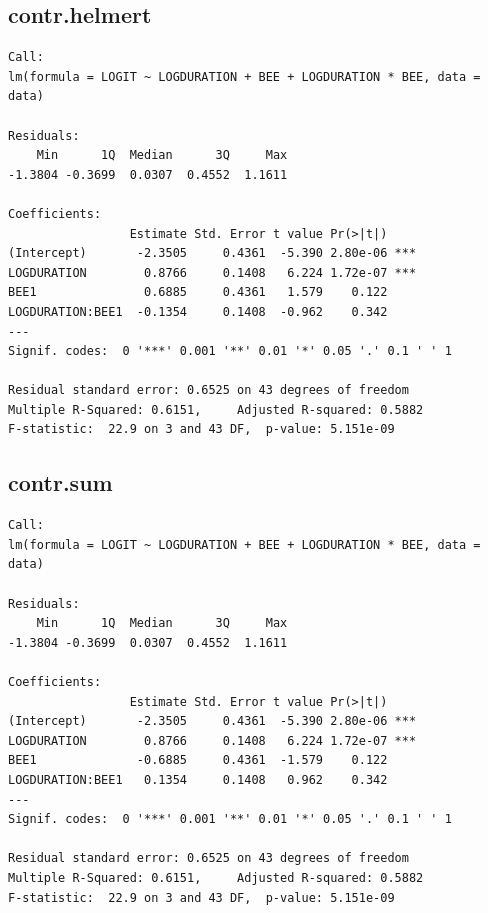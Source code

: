 \documentclass[a4paper,10pt]{article}
\begin{document}
\subsection{contr.helmert}
\begin{verbatim}
Call:
lm(formula = LOGIT ~ LOGDURATION + BEE + LOGDURATION * BEE, data = data)

Residuals:
    Min      1Q  Median      3Q     Max
-1.3804 -0.3699  0.0307  0.4552  1.1611

Coefficients:
                 Estimate Std. Error t value Pr(>|t|)
(Intercept)       -2.3505     0.4361  -5.390 2.80e-06 ***
LOGDURATION        0.8766     0.1408   6.224 1.72e-07 ***
BEE1               0.6885     0.4361   1.579    0.122
LOGDURATION:BEE1  -0.1354     0.1408  -0.962    0.342
---
Signif. codes:  0 '***' 0.001 '**' 0.01 '*' 0.05 '.' 0.1 ' ' 1

Residual standard error: 0.6525 on 43 degrees of freedom
Multiple R-Squared: 0.6151,     Adjusted R-squared: 0.5882
F-statistic:  22.9 on 3 and 43 DF,  p-value: 5.151e-09
\end{verbatim}

\subsection{contr.sum}
\begin{verbatim}
Call:
lm(formula = LOGIT ~ LOGDURATION + BEE + LOGDURATION * BEE, data = data)

Residuals:
    Min      1Q  Median      3Q     Max
-1.3804 -0.3699  0.0307  0.4552  1.1611

Coefficients:
                 Estimate Std. Error t value Pr(>|t|)
(Intercept)       -2.3505     0.4361  -5.390 2.80e-06 ***
LOGDURATION        0.8766     0.1408   6.224 1.72e-07 ***
BEE1              -0.6885     0.4361  -1.579    0.122
LOGDURATION:BEE1   0.1354     0.1408   0.962    0.342
---
Signif. codes:  0 '***' 0.001 '**' 0.01 '*' 0.05 '.' 0.1 ' ' 1

Residual standard error: 0.6525 on 43 degrees of freedom
Multiple R-Squared: 0.6151,     Adjusted R-squared: 0.5882
F-statistic:  22.9 on 3 and 43 DF,  p-value: 5.151e-09
\end{verbatim}
\end{document}
